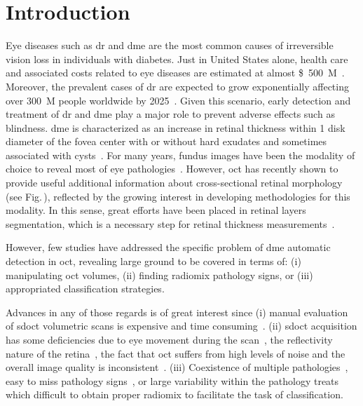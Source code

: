 \graphicspath{ {./content/intro/figures/} }

\section{Introduction}
\label{sec:intro}  %

Eye diseases such as \gls{dr} and \gls{dme} are the most common causes of irreversible vision loss in individuals with diabetes.
Just in United States alone, health care and associated costs related to eye diseases are estimated at almost \SI{500}[\$]{M}~\cite{Sharma2005}.
Moreover, the prevalent cases of \gls{dr} are expected to grow exponentially affecting over \SI{300}{M} people worldwide by 2025~\cite{Wild2004}.
Given this scenario, early detection and treatment of \gls{dr} and \gls{dme} play a major role to prevent adverse effects such as blindness.
\gls{dme} is characterized as an increase in retinal thickness within 1 disk diameter of the fovea center with or without hard exudates and sometimes associated with cysts~\cite{ETDRSG1985}.
For many years, fundus images have been the modality of choice to reveal most of eye pathologies~\cite{Mookiah20132136,Trucco2013}.
However, \gls{oct} has recently shown to provide useful additional information about cross-sectional retinal morphology~\cite{Wang2015} (see Fig.\,\cite{}), reflected by the growing interest in developing methodologies for this modality.
In this sense, great efforts have been placed in retinal layers segmentation, which is a necessary step for retinal thickness measurements~\cite{Chiu2010,Kafieh2013}.

However, few studies have addressed the specific problem of \gls{dme} automatic detection in \gls{oct}, revealing large ground to be covered in terms of: (i) manipulating \gls{oct} volumes, (ii) finding radiomix pathology signs, or (iii) appropriated classification strategies.

Advances in any of those regards is of great interest since (i) manual evaluation of \gls{sdoct} volumetric scans is expensive and time consuming~\cite{Venhuizen2015}.
(ii) \gls{sdoct} acquisition has some deficiencies due to eye movement during the scan~\cite{Liu2011}, the reflectivity nature of the retina~\cite{schuman2004optical}, the fact that \gls{oct} suffers from high levels of noise and the overall image quality is inconsistent~\cite{barnum2008local}.
(iii) Coexistence of multiple pathologies~\cite{Liu2011}, easy to miss pathology signs~\cite{Venhuizen2015}, or large variability within the pathology treats which difficult to obtain proper radiomix to facilitate the task of classification.

